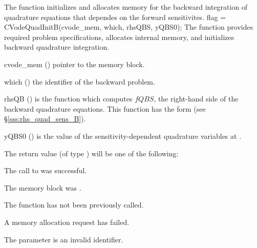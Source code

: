 The function  initializes and allocates memory for the backward
integration of quadrature equations that dependes on the forward sensitivites.
{
flag = CVodeQuadInitB(cvode\_mem, which, rhsQBS, yQBS0);
}
{
  The function  provides required problem specifications,
  allocates internal memory, and initializes backward quadrature integration.
}
{
  \begin{args}
  \item[cvode\_mem] ()
    pointer to the {\cvodes} memory block.
  \item[which] ()
    the identifier of the backward problem.
  \item[rhsQB] ()
    is the {\C} function which computes $fQBS$, the right-hand side of the 
    backward quadrature equations. This function has the form 
    (see \S\ref{sss:rhs_quad_sens_B}).
  \item[yQBS0] ()
    is the value of the sensitivity-dependent quadrature variables at .
  \end{args}
}
{
  The return value  (of type ) will be one of the following:
  \begin{args}
  \item[\Id{CV\_SUCCESS}]
    The call to  was successful.
  \item[\Id{CV\_MEM\_NULL}] 
    The  memory block was .
  \item[\Id{CV\_NO\_ADJ}]
    The function  has not been previously called.
  \item[\Id{CV\_MEM\_FAIL}] 
    A memory allocation request has failed.
  \item[\Id{CV\_ILL\_INPUT}]
    The parameter  is an invalid identifier.
  \end{args}
}
{}


